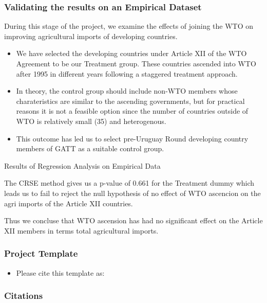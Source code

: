 \documentclass[11pt, aspectratio=169]{beamer}
\begin{document}
\begin{frame}[t]
    \frametitle{Validating the results on an Empirical Dataset}

    During this stage of the project, we examine the effects of joining the WTO on improving agricultural imports of developing countries.

    \begin{itemize}
        \item We have selected the developing countries under Article XII of the WTO Agreement to be our Treatment group. These countries ascended into WTO after 1995 in different years following a staggered treatment approach.
        \item In theory, the control group should include non-WTO members whose charateristics are similar to the ascending governments, but for practical reasons it is not a feasible option since the number of countries outside of WTO is relatively small (35) and heterogenous.
        \item This outcome has led us to select pre-Uruguay Round developing country members of GATT as a suitable control group.
    \end{itemize}

\end{frame}

\begin{frame}{Results of Regression Analysis on Empirical Data}

   The CRSE method gives us a p-value of 0.661 for the Treatment dummy which leads us to fail to reject
   the null hypothesis of no effect of WTO ascencion on the agri imports of the Article XII countries.

   Thus we concluse that WTO ascension has had no significant effect on the Article XII members in terms
   total agricultural imports.
    
\end{frame}


\begin{frame}[t]
    \frametitle{Project Template}
    \begin{itemize}
        \item<+-> Please cite this template as: \citet{GaudeckerEconProjectTemplates}
    \end{itemize}
    \note{~}
\end{frame}





 {
    \begin{frame}
        \frametitle{}
    \end{frame}

}

\begin{frame}[allowframebreaks]
    \frametitle{Citations}
    \renewcommand{\bibfont}{\normalfont\footnotesize}
    \printbibliography
\end{frame}
\end{document}
